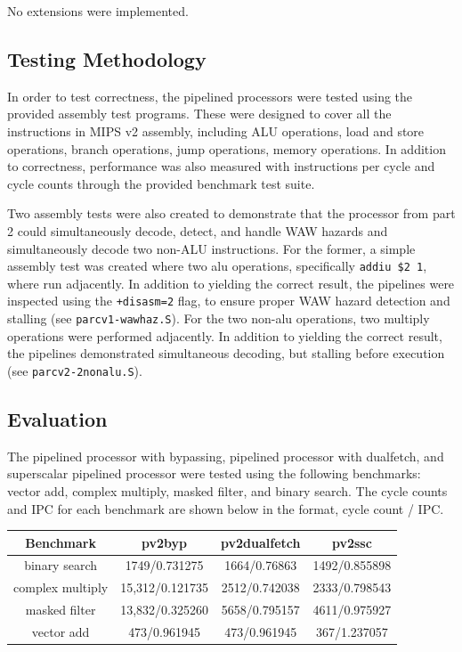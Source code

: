 \documentclass[11pt]{article}
\begin{document}
\noindent No extensions were implemented.

\subsection*{Testing Methodology}

In order to test correctness, the pipelined processors were tested using the
provided assembly test programs. These were designed to cover all the instructions in MIPS v2 assembly, 
including ALU operations, load and store operations, branch operations, jump operations, 
memory operations. In addition to correctness, performance was also measured with instructions per
cycle and cycle counts through the provided benchmark test suite. 

Two assembly tests were also created to demonstrate that the processor from
part 2 could simultaneously decode, detect, and handle WAW hazards and simultaneously decode
two non-ALU instructions. For the former, a simple assembly test was created where two alu operations, specifically 
\texttt{addiu \$2 1}, where run adjacently. In addition to yielding the correct result, the pipelines were inspected using the \texttt{+disasm=2} flag, 
to ensure proper WAW hazard detection and stalling (see \texttt{parcv1-wawhaz.S}). For the two non-alu operations, two multiply operations
were performed adjacently. In addition to yielding the correct result, the pipelines demonstrated simultaneous decoding,
but stalling before execution (see \texttt{parcv2-2nonalu.S}).

\subsection*{Evaluation}

The pipelined processor with bypassing, pipelined processor with dualfetch, and superscalar pipelined processor were tested using the following
benchmarks: vector add, complex multiply, masked filter, and binary search. The
cycle counts and IPC for each benchmark are shown below in the format, cycle
count / IPC.

\begin{center}
    \begin{tabular}{|c || c | c | c|} 
 \hline
 Benchmark & pv2byp & pv2dualfetch & pv2ssc \\
 \hline
 \hline
 binary search & 1749/0.731275 & 1664/0.76863 & 1492/0.855898 \\
 \hline
 complex multiply & 15,312/0.121735 & 2512/0.742038 & 2333/0.798543 \\
 \hline
 masked filter & 13,832/0.325260 & 5658/0.795157 & 4611/0.975927 \\
 \hline
 vector add & 473/0.961945 & 473/0.961945 & 367/1.237057 \\
 \hline

\end{tabular}
\end{center}
\end{document}
